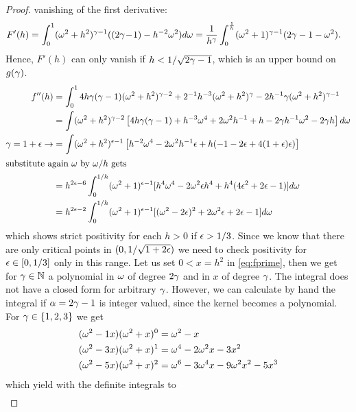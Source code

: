 \documentclass[smallabstract,smallcaptions]{dccpaper}
\begin{document}
\begin{proof}
  vanishing of the first derivative:
  \begin{align}
    F'(h)  &= \int_0^{1} (\omega^2+h^2)^{\gamma-1}( (2\gamma\!-\!1)-h^{-2}\omega^2)d\omega
            =\frac{1}{h^{\gamma}}\int_{0}^{\frac{1}{h}} (\omega^2+1)^{\gamma-1}(2\gamma-1-\omega^2)\notag.
  \end{align}
  Hence, $F'(h)$ can only vanish if $h<1/\sqrt{2\gamma-1}$, which is an upper bound on $g(\gamma)$.
%
\begin{align}
f''(h) &=\int_0^1 4h\gamma(\gamma-1)(\omega^2+h^2)^{\gamma-2} + 2^{-1}h^{-3}(\omega^2+h^2)^{\gamma} - 2h^{-1}\gamma(\omega^2+h^2)^{\gamma-1}\\
&= \int (\omega^2+h^2)^{\gamma-2}\left[ 4h\gamma(\gamma-1)+h^{-3}\omega^4 + 2\omega^2 h^{-1} +h -2\gamma h^{-1}\omega^2-2\gamma h\right]d
\omega\notag\\
\gamma=1+\epsilon\rightarrow &= \int (\omega^2+h^2)^{\epsilon-1}\left[h^{-2} \omega^4 -2\omega^2 h^{-1}\epsilon+h(-1-2\epsilon+4(1+\epsilon)\epsilon)\right] \\
\intertext{substitute again $\omega$ by $\omega/h$ gets}
&=h^{2\epsilon-6}\int_0^{1/h}(\omega^2+1)^{\epsilon-1}[h^4\omega^4-2\omega^2\epsilon h^{4} +h^{4}(4\epsilon^2+2\epsilon-1)]d\omega\\
&=h^{2\epsilon-2}\int_0^{1/h}(\omega^2+1)^{\epsilon-1}[ (\omega^2-2\epsilon)^2 +2\omega^2\epsilon +2\epsilon-1]d\omega
\end{align}
%
which shows strict positivity for each $h>0$ if $\epsilon>1/3$. Since we know that there are only critical points in
$(0,1/\sqrt{1+2\epsilon})$ we need to check positivity for $\epsilon\in[0,1/3]$ only in this range. 
%
\fi %
%
Let us set $0<x=h^2$ in \eqref{eq:fprime}, then we get for $\gamma\in{\ensuremath{\mathbb N}}$ a polynomial in $\omega$ of degree $2\gamma$ and in
$x$ of degree $\gamma$.
%
%
The integral does not have a closed form for arbitrary $\gamma$. However, we can calculate by hand the integral if
$\alpha=2\gamma-1$ is integer valued, since the kernel becomes a polynomial. For $\gamma\in\{1,2,3\}$ we get 
%
\begin{align}
  (\omega^2-1x)(\omega^2+x)^0 &=\omega^2-x\\
  (\omega^2-3x)(\omega^2+x)^1 &=\omega^4 -2\omega^2x -3x^2 \\
  (\omega^2-5x)(\omega^2+x)^2 &=\omega^6 -3\omega^4x -9\omega^2x^2-5x^3
\end{align}
%
which yield with the definite integrals to
%
\begin{align}

\end{align}
\end{proof}
\end{document}
